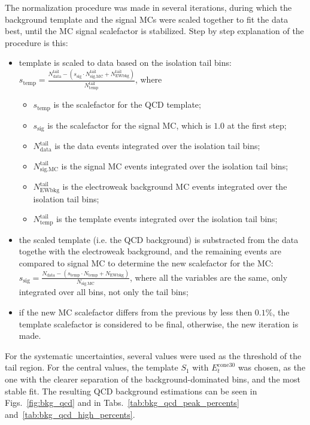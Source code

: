 The normalization procedure was made in several iterations, during which the background template and the signal MCs were scaled together to fit the data best, until the MC signal scalefactor is stabilized. Step by step explanation of the procedure is this:
\begin{itemize}
\item template is scaled to data based on the isolation tail bins: $s_{\mathrm{temp}} = \frac{N_{\mathrm{data}}^{\mathrm{tail}} - (s_{\mathrm{sig}} \cdot N_{\mathrm{sig.MC}}^{\mathrm{tail}}+N_{\mathrm{EWbkg}}^{\mathrm{tail}})}{N_{\mathrm{temp}}^{\mathrm{tail}}}$, where
\begin{itemize}
\item $s_{\mathrm{temp}}$ is the scalefactor for the QCD template;
\item $s_{\mathrm{sig}}$ is the scalefactor for the signal MC, which is $1.0$ at the first step;
\item $N_{\mathrm{data}}^{\mathrm{tail}}$ is the data events integrated over the isolation tail bins;
\item $N_{\mathrm{sig.MC}}^{\mathrm{tail}}$ is the signal MC events integrated over the isolation tail bins;
\item $N_{\mathrm{EWbkg}}^{\mathrm{tail}}$ is the electroweak background MC events integrated over the isolation tail bins;
\item $N_{\mathrm{temp}}^{\mathrm{tail}}$ is the template events integrated over the isolation tail bins;
\end{itemize}
\item the scaled template (i.e. the QCD background) is substracted from the data togethe with the electroweak background, and the remaining events are compared to signal MC to determine the new scalefactor for the MC: $s_{\mathrm{sig}} = \frac{N_{\mathrm{data}} - (s_{\mathrm{temp}} \cdot N_{\mathrm{temp}} + N_{\mathrm{EWbkg}})}{N_{\mathrm{sig.MC}}}$, where all the variables are the same, only integrated over all bins, not only the tail bins;
\item if the new MC scalefactor differs from the previous by less then $0.1$\%, the template scalefactor is considered to be final, otherwise, the new iteration is made.
\end{itemize}

For the systematic uncertainties, several values were used as the threshold of the tail region. For the central values, the template $S_{1}$ with $E_{t}^{\mathrm{cone30}}$ was chosen, as the one with the clearer separation of the background-dominated bins, and the most stable fit. The resulting QCD background estimations can be seen in Figs.~\ref{fig:bkg_qcd} and in Tabs.~\ref{tab:bkg_qcd_peak_percents} and~\ref{tab:bkg_qcd_high_percents}.

